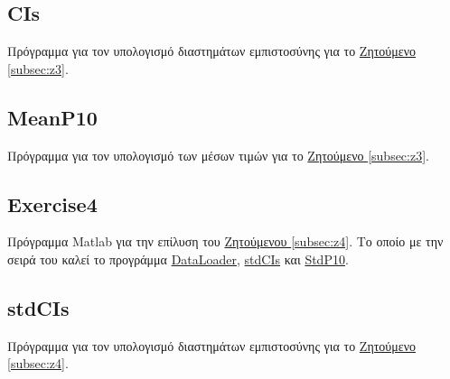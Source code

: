 \documentclass[11pt]{scrartcl} %
\begin{document}
\subsection{CIs}
\label{prog:CIs}
Πρόγραμμα για τον υπολογισμό διαστημάτων εμπιστοσύνης για το \hyperref[subsec:z3]{Ζητούμενο \ref*{subsec:z3}}.


\subsection{MeanP10}
\label{prog:MeanP10}
Πρόγραμμα για τον υπολογισμό των μέσων τιμών για το \hyperref[subsec:z3]{Ζητούμενο \ref*{subsec:z3}}.

	
\subsection{Exercise4}
\label{prog:4}
Πρόγραμμα Matlab για την επίλυση του \hyperref[subsec:z4]{Ζητούμενου \ref*{subsec:z4}}. Το οποίο με την σειρά του καλεί το προγράμμα \hyperref[prog:DataLoader]{DataLoader}, \hyperref[prog:stdCIs]{stdCIs} και \hyperref[prog:StdP10]{StdP10}.


\subsection{stdCIs}
\label{prog:stdCIs}
Πρόγραμμα για τον υπολογισμό διαστημάτων εμπιστοσύνης για το \hyperref[subsec:z4]{Ζητούμενο \ref*{subsec:z4}}.

\end{document}
